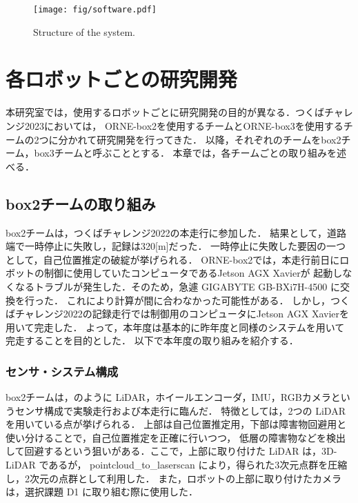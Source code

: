 \documentclass[twocolumn, 9pt]{jsproceedings}
\begin{document}
\begin{figure}[h!]
  \centering
  \texttt{[image: fig/software.pdf]}
  \caption{Structure of the system.}
  \label{fig:soft-fig}
\end{figure}

\vspace*{2mm}

\section{各ロボットごとの研究開発}
本研究室では，使用するロボットごとに研究開発の目的が異なる．つくばチャレンジ2023においては，
ORNE-box2を使用するチームとORNE-box3を使用するチームの2つに分かれて研究開発を行ってきた．
以降，それぞれのチームをbox2チーム，box3チームと呼ぶこととする．
本章では，各チームごとの取り組みを述べる．

\subsection{box2チームの取り組み}


box2チームは，つくばチャレンジ2022の本走行に参加した．
結果として，道路端で一時停止に失敗し，記録は320[m]だった．
一時停止に失敗した要因の一つとして，自己位置推定の破綻が挙げられる．
ORNE-box2では，本走行前日にロボットの制御に使用していたコンピュータであるJetson AGX Xavierが
起動しなくなるトラブルが発生した．そのため，急遽 GIGABYTE GB-BXi7H-4500 に交換を行った．
これにより計算が間に合わなかった可能性がある．
しかし，つくばチャレンジ2022の記録走行では制御用のコンピュータにJetson AGX Xavierを用いて完走した．
よって，本年度は基本的に昨年度と同様のシステムを用いて完走することを目的とした．
以下で本年度の取り組みを紹介する．

\subsubsection{センサ・システム構成}
box2チームは，のように LiDAR，ホイールエンコーダ，IMU，RGBカメラというセンサ構成で実験走行および本走行に臨んだ．
特徴としては，2つの LiDAR を用いている点が挙げられる．
上部は自己位置推定用，下部は障害物回避用と使い分けることで，自己位置推定を正確に行いつつ，
低層の障害物などを検出して回避するという狙いがある．ここで，上部に取り付けた LiDAR は，3D-LiDAR であるが，
pointcloud\_to\_laserscan\cite{pointcloud} により，得られた3次元点群を圧縮し，2次元の点群として利用した．
また，ロボットの上部に取り付けたカメラは，選択課題 D1 に取り組む際に使用した．\\
\end{document}
